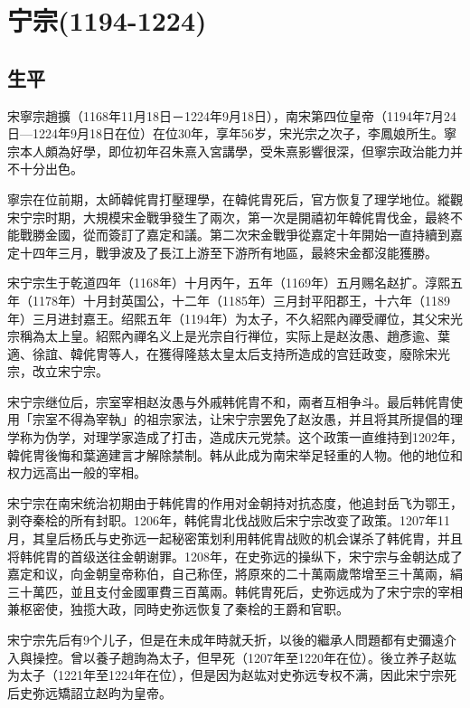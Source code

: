 
\section{宁宗\tiny(1194-1224)}

\subsection{生平}

宋寧宗趙擴（1168年11月18日－1224年9月18日），南宋第四位皇帝（1194年7月24日—1224年9月18日在位）在位30年，享年56岁，宋光宗之次子，李鳳娘所生。寧宗本人頗為好學，即位初年召朱熹入宮講學，受朱熹影響很深，但寧宗政治能力并不十分出色。

寧宗在位前期，太師韓侂胄打壓理學，在韓侂胄死后，官方恢复了理学地位。縱觀宋宁宗时期，大規模宋金戰爭發生了兩次，第一次是開禧初年韓侂胄伐金，最終不能戰勝金國，從而簽訂了嘉定和議。第二次宋金戰爭從嘉定十年開始一直持續到嘉定十四年三月，戰爭波及了長江上游至下游所有地區，最終宋金都沒能獲勝。

宋宁宗生于乾道四年（1168年）十月丙午，五年（1169年）五月赐名赵扩。淳熙五年（1178年）十月封英国公，十二年（1185年）三月封平阳郡王，十六年（1189年）三月进封嘉王。绍熙五年（1194年）为太子，不久紹熙內禪受禪位，其父宋光宗稱為太上皇。紹熙內禪名义上是光宗自行禅位，实际上是赵汝愚、趙彥逾、葉適、徐誼、韓侂冑等人，在獲得隆慈太皇太后支持所造成的宫廷政变，廢除宋光宗，改立宋宁宗。

宋宁宗继位后，宗室宰相赵汝愚与外戚韩侂胄不和，兩者互相争斗。最后韩侂胄使用「宗室不得為宰執」的祖宗家法，让宋宁宗罢免了赵汝愚，并且将其所提倡的理学称为伪学，对理学家造成了打击，造成庆元党禁。这个政策一直维持到1202年，韓侂冑後悔和葉適建言才解除禁制。韩从此成为南宋举足轻重的人物。他的地位和权力远高出一般的宰相。

宋宁宗在南宋统治初期由于韩侂胄的作用对金朝持对抗态度，他追封岳飞为鄂王，剥夺秦桧的所有封职。1206年，韩侂胄北伐战败后宋宁宗改变了政策。1207年11月，其皇后杨氏与史弥远一起秘密策划利用韩侂胄战败的机会谋杀了韩侂胄，并且将韩侂胄的首级送往金朝谢罪。1208年，在史弥远的操纵下，宋宁宗与金朝达成了嘉定和议，向金朝皇帝称伯，自己称侄，將原來的二十萬兩歲幣增至三十萬兩，絹三十萬匹，並且支付金國軍費三百萬兩。韩侂胄死后，史弥远成为了宋宁宗的宰相兼枢密使，独揽大政，同時史弥远恢复了秦桧的王爵和官职。

宋宁宗先后有9个儿子，但是在未成年時就夭折，以後的繼承人問題都有史彌遠介入與操控。曾以養子趙詢為太子，但早死（1207年至1220年在位）。後立养子赵竑为太子（1221年至1224年在位），但是因为赵竑对史弥远专权不满，因此宋宁宗死后史弥远矯詔立赵昀为皇帝。

